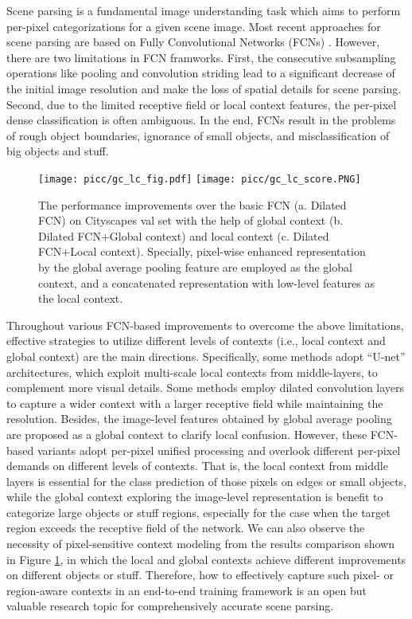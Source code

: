 \documentclass[10pt,twocolumn,letterpaper]{article}
\begin{document}
Scene parsing is a fundamental image understanding task which aims to perform per-pixel categorizations for a given scene image. Most recent approaches for scene parsing are based on Fully Convolutional Networks (FCNs) \cite{FCN}. However, there are two limitations in FCN framworks. First, the consecutive subsampling operations like pooling and convolution striding lead to a significant decrease of the initial image resolution and make the loss of spatial details for scene parsing. Second, due to the limited receptive field \cite{parsenet,luo2016understanding} or local context features, the per-pixel dense classification is often ambiguous. In the end, FCNs result in the problems of rough object boundaries, ignorance of small objects, and misclassification of big objects and stuff.

\begin{figure}[!t]
        \centering
        \texttt{[image: picc/gc\_lc\_fig.pdf]}
       \texttt{[image: picc/gc\_lc\_score.PNG]}

        \caption{The performance improvements over the basic FCN (a. Dilated FCN) on Cityscapes val set with the help of global context (b. Dilated FCN+Global context) and local context (c. Dilated FCN+Local context). Specially, pixel-wise enhanced representation by the global average pooling feature are employed as the global context, and a concatenated representation with low-level features as the local context.  }
        \label{example}\vspace{-1em}
\end{figure}

Throughout various FCN-based improvements to overcome the above limitations, effective strategies to utilize different levels of contexts (i.e., local context and global context) are the main directions. Specifically, some methods \cite{refinenet,exfuse, yu2018learning,fu2017stacked} adopt ``U-net'' architectures, which exploit multi-scale local contexts from middle-layers, to complement more visual details. Some methods \cite{deeplabv2,yu2015multi} employ dilated convolution layers to capture a wider context with a larger receptive field while maintaining the resolution. Besides, the image-level features obtained by global average pooling \cite{parsenet,deeplabv3,pspnet} are proposed  as a global context to clarify local confusion. However, these FCN-based variants adopt per-pixel unified processing and overlook different per-pixel demands on different levels of contexts.  
That is, the local context from middle layers is essential for the class prediction of those pixels on edges or small objects, while the global context exploring the image-level representation is benefit to categorize large objects or stuff regions, especially for the case when the target region exceeds the receptive field of the network.
We can also observe the necessity of pixel-sensitive context modeling from the results comparison shown in Figure \ref{example}, in which the local and global contexts achieve different improvements on different objects or stuff. 
Therefore, how to effectively capture such pixel- or region-aware contexts in an end-to-end training framework is an open but valuable research topic for comprehensively accurate scene parsing. 
\end{document}

